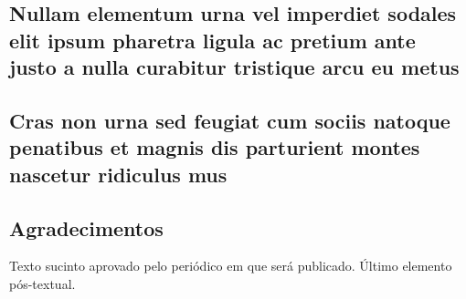 \documentclass[
article,			%
11pt,				%
oneside,			%
a4paper,			%
english,			%
brazil,				%
sumario=tradicional
]{abntex2}
\begin{document}
	\lipsum[3]
	
	\postextual
	
	
	
	
	
	\begin{apendicesenv}
		
		\chapter{Nullam elementum urna vel imperdiet sodales elit ipsum pharetra ligula
			ac pretium ante justo a nulla curabitur tristique arcu eu metus}
		\lipsum[55-56]
		
	\end{apendicesenv}
	
	\begin{anexosenv}
		
		\chapter{Cras non urna sed feugiat cum sociis natoque penatibus et magnis dis
			parturient montes nascetur ridiculus mus}
		
		\lipsum[31]
		
	\end{anexosenv}
	
	
	\section*{Agradecimentos}
	Texto sucinto aprovado pelo periódico em que será publicado. Último 
	elemento pós-textual.
	
\end{document}
